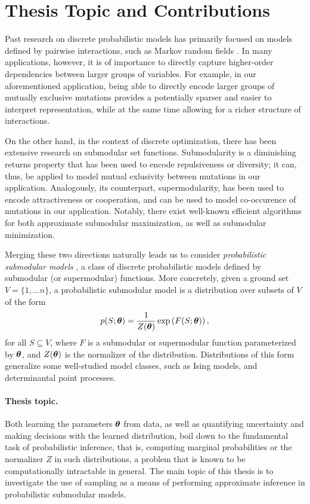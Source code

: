 \section{Thesis Topic and Contributions}
Past research on discrete probabilistic models has primarily focused on models defined by pairwise interactions, such as Markov random fields \cite{koller09}.
In many applications, however, it is of importance to directly capture higher-order dependencies between larger groups of variables.
For example, in our aforementioned application, being able to directly encode larger groups of mutually exclusive mutations provides a potentially sparser and easier to interpret representation, while at the same time allowing for a richer structure of interactions.

On the other hand, in the context of discrete optimization, there has been extensive research on submodular set functions.
Submodularity is a diminishing returns property that has been used to encode repulsiveness or diversity; it can, thus, be applied to model mutual exlusivity between mutations in our application.
Analogously, its counterpart, supermodularity, has been used to encode attractiveness or cooperation, and can be used to model co-occurence of mutations in our application.
Notably, there exist well-known efficient algorithms for both approximate submodular maximization, as well as submodular minimization.

Merging these two directions naturally leads us to consider \emph{probabilistic submodular models} \citep{djolonga14,gotovos15}, a class of discrete probabilistic models defined by submodular (or supermodular) functions.
More concretely, given a ground set $V = \{1,\ldots n\}$, a probabilistic submodular model is a distribution over subsets of $V$ of the form
\begin{align*}
p(S; \bm{\theta}) = \frac{1}{Z(\bm{\theta})} \exp\left( F(S; \bm{\theta}) \right),
\end{align*}
for all $S \subseteq V$, where $F$ is a submodular or supermodular function parameterized by $\bm{\theta}$, and $Z(\bm{\theta})$ is the normalizer of the distribution.
Distributions of this form generalize some well-studied model classes, such as Ising models, and determinantal point processes.

\paragraph{Thesis topic.} Both learning the parameters $\bm{\theta}$ from data, as well as quantifying uncertainty and making decisions with the learned distribution, boil down to the fundamental task of probabilistic inference, that is, computing marginal probabilities or the normalizer $Z$ in such distributions, a problem that is known to be computationally intractable in general.
The main topic of this thesis is to investigate the use of sampling as a means of performing approximate inference in probabilistic submodular models.

